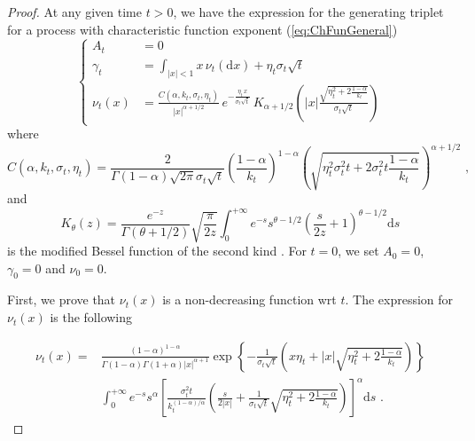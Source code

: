 \documentclass[12pt]{article}
\theoremstyle{definition}
\theoremstyle{remark}
\numberwithin{theorem}{section}
\numberwithin{proposition}{section}
\numberwithin{lemma}{section}
\numberwithin{corollary}{section}
\numberwithin{definition}{section}
\numberwithin{remark}{section}
\numberwithin{example}{section}
\begin{document}
\begin{proof}  %


At any given time $t>0$, we have the expression for the generating triplet for a process with characteristic function exponent (\ref{eq:ChFunGeneral}) \citep[see, e.g.,][eq.(4.24), p.130]{Cont}
\begin{equation*}
\begin{cases}
A_t&=0\\
\gamma_t&=\int_{|x|<1}x\,\nu_t(\mathrm{d}x)+\eta_t\sigma_t\sqrt{t}\\
\nu_t(x)&=\frac{C(\alpha,k_t,\sigma_t,\eta_t)}{|x|^{\alpha+1/2}}\,e^{-\frac{\eta_t\,x}{\sigma_t\sqrt{t}}}\,K_{\alpha+1/2}\left(|x|\frac{\sqrt{\eta_t^2+2\frac{1-\alpha}{k_t}}}{\sigma_t\sqrt{t}}\right)
\end{cases}
\end{equation*}
where
\begin{equation*}
C(\alpha,k_t,\sigma_t,\eta_t)=\frac{2}{\Gamma(1-\alpha)\sqrt{2\pi}\sigma_t\sqrt{t}}\left(\frac{1-\alpha}{k_t}\right)^{1-\alpha}\left(\sqrt{\eta_t^2\sigma_t^2t+2\sigma_t^2t\frac{1-\alpha}{k_t}}\right)^{\alpha+1/2}\,\, ,
\end{equation*}
and
\begin{equation*}
K_\theta(z)=\frac{e^{-z}}{\Gamma(\theta+1/2)}\sqrt{\frac{\pi}{2z}}\int_0^{+\infty}e^{-s}s^{\theta-1/2}\left(\frac{s}{2z}+1\right)^{\theta-1/2}\mathrm{d}s
\end{equation*}
is the modified Bessel function of the second kind \citep[see, e.g.,][Ch.9, p.376]{abramowitz1948handbook}. For $t=0$, we set $A_0=0$, $\gamma_0=0$ and $\nu_0=0$.

\bigskip

First, we prove that $\nu_t(x)$ is a non-decreasing function wrt $t$. The expression for $\nu_t(x)$ is the following 

\begin{align*}
\nu_t(x)=&\frac{(1-\alpha)^{1-\alpha}}{\Gamma(1-\alpha)\Gamma(1+\alpha)|x|^{\alpha+1}}\exp\left\{-\frac{1}{\sigma_t\sqrt{t}}\left(x\eta_t+|x|\sqrt{\eta_t^2+2\frac{1-\alpha}{k_t}}\right)\right\}\\
&\int_0^{+\infty}e^{-s}s^{\alpha}\left[\frac{\sigma_t^2t}{k_t^{(1-\alpha)/\alpha}}\left(\frac{s}{2|x|}+\frac{1}{\sigma_t\sqrt{t}}\sqrt{\eta_t^2+2\frac{1-\alpha}{k_t}}\right)\right]^{\alpha}\mathrm{d}s\,\,.
\end{align*}


\end{proof}
\end{document}
